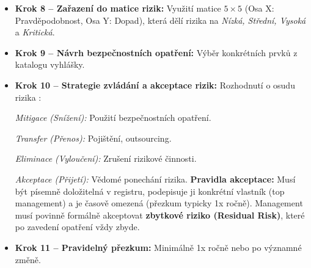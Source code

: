 \documentclass[10pt,a4paper]{article}
\begin{document}
\begin{itemize}
		\textit{Model 1:} $P = H \times Z$ a následně $R = D \times P$ (nejpoužívanější model v ČR).
		
		\textit{Model 2 (Courtneyho vzorec):} Přímý součin $R = D \times H \times Z$.
		
		Důvody opouštění čistého násobení v moderních metodikách NÚKIB:
		\begin{enumerate}
			\item \textbf{Problém absolutní nuly:} Pokud je hrozba ohodnocena 0, vynásobením zmizí celé riziko, přestože v kyberbezpečnosti nulové riziko neexistuje.
			\item \textbf{Deformace lineární škály:} Výsledky násobení generují nerovnoměrné skoky (napedř. skok z 16 na 20, pak na 25), což komplikuje férové stanovení hranice akceptovatelnosti.
			\item \textbf{Rozměrová nekompatibilita:} Pravděpodobnost je bezrozměrné číslo (či procento), zatímco dopad se měří ve financích či lidských životech; jejich prosté násobení nedává ekonomický ani fyzikální smysl. Moderní praxe proto využívá převodní matice (Risk Matrix).
		\end{enumerate}

		\item \textbf{Krok 8 -- Zařazení do matice rizik:} Využití matice $5 \times 5$ (Osa X: Pravděpodobnost, Osa Y: Dopad), která dělí rizika na \textit{Nízká, Střední, Vysoká} a \textit{Kritická}.
		
		\item \textbf{Krok 9 -- Návrh bezpečnostních opatření:} Výběr konkrétních prvků z katalogu vyhlášky.
		
		\item \textbf{Krok 10 -- Strategie zvládání a akceptace rizik:} Rozhodnutí o osudu rizika :  
		
		\textit{Mitigace (Snížení):} Použití bezpečnostních opatření.  
		
		\textit{Transfer (Přenos):} Pojištění, outsourcing.  
		
		\textit{Eliminace (Vyloučení):} Zrušení rizikové činnosti.  
		
		\textit{Akceptace (Přijetí):} Vědomé ponechání rizika. \textbf{Pravidla akceptace:} Musí být písemně doložitelná v registru, podepisuje ji konkrétní vlastník (top management) a je časově omezená (přezkum typicky 1x ročně). Management musí povinně formálně akceptovat \textbf{zbytkové riziko (Residual Risk)}, které po zavedení opatření vždy zbyde.
		\item \textbf{Krok 11 -- Pravidelný přezkum:} Minimálně 1x ročně nebo po významné změně.
	\end{itemize}
	
\end{document}
